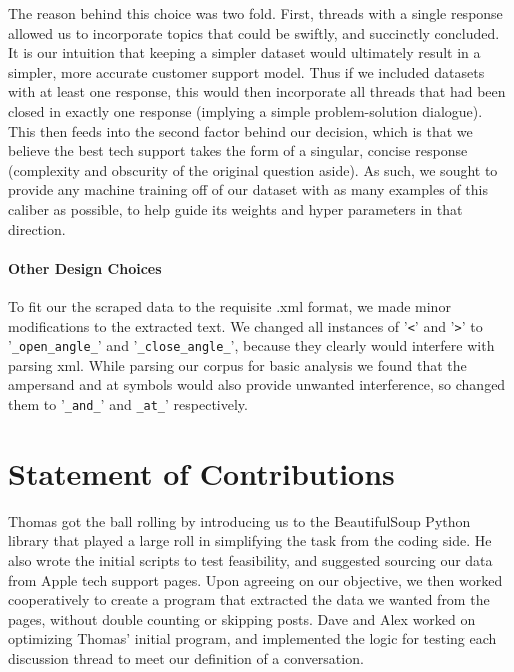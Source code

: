 \documentclass[10pt]{article}
\begin{document}
\begin{multicols}{2}
The reason behind this choice was two fold. First, threads with a single response allowed us to incorporate topics that could be swiftly, and succinctly concluded. It is our intuition that keeping a simpler dataset would ultimately result in a simpler, more accurate customer support model. Thus if we included datasets with at least one response, this would then incorporate all threads that had been closed in exactly one response (implying a simple problem-solution dialogue). This then feeds into the second factor behind our decision, which is that we believe the best tech support takes the form of a singular, concise response (complexity and obscurity of the original question aside). As such, we sought to provide any machine training off of our dataset with as many examples of this caliber as possible, to help guide its weights and hyper parameters in that direction.

\paragraph{Other Design Choices}
To fit our the scraped data to the requisite .xml format, we made minor modifications to the extracted text. We changed all instances of '\texttt{<}' and '\texttt{>}' to '\texttt{\_open\_angle\_}' and '\texttt{\_close\_angle\_}', because they clearly would interfere with parsing xml. While parsing our corpus for basic analysis we found that the ampersand and at symbols would also provide unwanted interference, so changed them to '\texttt{\_and\_}' and \texttt{\_at\_}' respectively.










\section{Statement of Contributions}
Thomas got the ball rolling by introducing us to the BeautifulSoup Python library that played a large roll in simplifying the task from the coding side. He also wrote the initial scripts to test feasibility, and suggested sourcing our data from Apple tech support pages. Upon agreeing on our objective, we then worked cooperatively to create a program that extracted the data we wanted from the pages, without double counting or skipping posts. Dave and Alex worked on optimizing Thomas' initial program, and implemented the logic for testing each discussion thread to meet our definition of a conversation. \\


\end{multicols}
\end{document}
